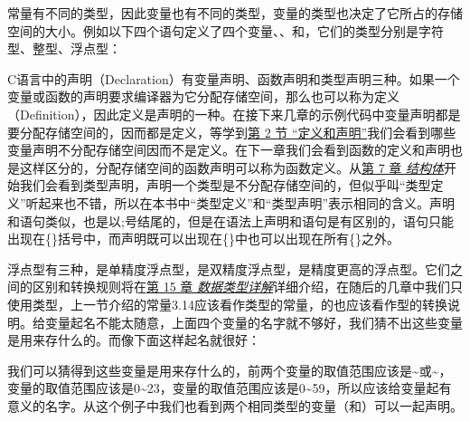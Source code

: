 常量有不同的类型，因此变量也有不同的类型，变量的类型也决定了它所占的存储空间的大小。例如以下四个语句定义了四个变量、、和，它们的类型分别是字符型、整型、浮点型：



\begin{BookNote}


C语言中的声明（Declaration）有变量声明、函数声明和类型声明三种。如果一个变量或函数的声明要求编译器为它分配存储空间，那么也可以称为定义（Definition），因此定义是声明的一种。在接下来几章的示例代码中变量声明都是要分配存储空间的，因而都是定义，等学到\hyperlink{db.ch20s02.id2787359}{第 2 节 “定义和声明”}我们会看到哪些变量声明不分配存储空间因而不是定义。在下一章我们会看到函数的定义和声明也是这样区分的，分配存储空间的函数声明可以称为函数定义。从\hyperlink{db.ch07.id2730134}{第 7 章 \emph{结构体}}开始我们会看到类型声明，声明一个类型是不分配存储空间的，但似乎叫“类型定义”听起来也不错，所以在本书中“类型定义”和“类型声明”表示相同的含义。声明和语句类似，也是以;号结尾的，但是在语法上声明和语句是有区别的，语句只能出现在\{\}括号中，而声明既可以出现在\{\}中也可以出现在所有\{\}之外。

\end{BookNote}


浮点型有三种，是单精度浮点型，是双精度浮点型，是精度更高的浮点型。它们之间的区别和转换规则将在\hyperlink{db.ch15.id2756555}{第 15 章 \emph{数据类型详解}}详细介绍，在随后的几章中我们只使用类型，上一节介绍的常量3.\BookSplit{}14应该看作类型的常量，的也应该看作型的转换说明。给变量起名不能太随意，上面四个变量的名字就不够好，我们猜不出这些变量是用来存什么的。而像下面这样起名就很好：




我们可以猜得到这些变量是用来存什么的，前两个变量的取值范围应该是\textasciitilde{}或\textasciitilde{}，变量的取值范围应该是0\textasciitilde{}\BookSplit{}23，变量的取值范围应该是0\textasciitilde{}\BookSplit{}59，所以应该给变量起有意义的名字。从这个例子中我们也看到两个相同类型的变量（和）可以一起声明。



